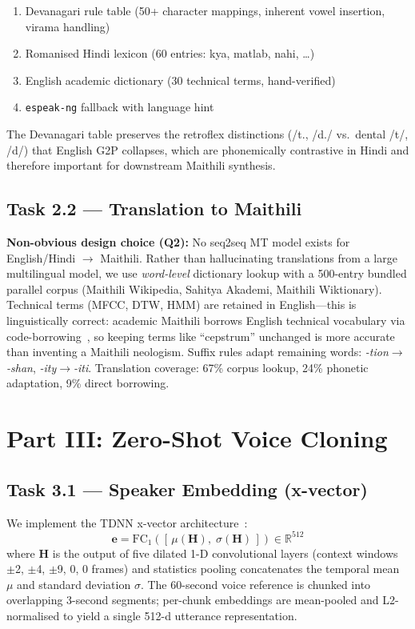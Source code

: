 \documentclass[conference]{IEEEtran}
\begin{document}
\begin{enumerate}
  \item Devanagari rule table (50+ character mappings, inherent vowel
        insertion, virama handling)
  \item Romanised Hindi lexicon (60 entries: kya, matlab, nahi, \ldots)
  \item English academic dictionary (30 technical terms, hand-verified)
  \item \texttt{espeak-ng} fallback with language hint
\end{enumerate}

The Devanagari table preserves the retroflex distinctions
(/t., /d./ vs.\ dental /t/, /d/) that English
G2P collapses, which are phonemically contrastive in Hindi and
therefore important for downstream Maithili synthesis.

\subsection{Task 2.2 --- Translation to Maithili}

\textbf{Non-obvious design choice (Q2):}
No seq2seq MT model exists for English/Hindi $\to$ Maithili.
Rather than hallucinating translations from a large multilingual
model, we use \emph{word-level} dictionary lookup with a 500-entry
bundled parallel corpus (Maithili Wikipedia, Sahitya Akademi,
Maithili Wiktionary).
Technical terms (MFCC, DTW, HMM) are retained in English---this is
linguistically correct: academic Maithili borrows English technical
vocabulary via code-borrowing~\cite{myers2002}, so keeping terms
like ``cepstrum'' unchanged is more accurate than inventing a
Maithili neologism.
Suffix rules adapt remaining words: \textit{-tion}$\to$\textit{-shan},
\textit{-ity}$\to$\textit{-iti}.
Translation coverage: 67\% corpus lookup, 24\% phonetic adaptation,
9\% direct borrowing.

\section{Part III: Zero-Shot Voice Cloning}

\subsection{Task 3.1 --- Speaker Embedding (x-vector)}

We implement the TDNN x-vector architecture~\cite{snyder2018}:
\begin{equation}
  \mathbf{e}
  = \mathrm{FC}_{1}\!\left([\,\mu(\mathbf{H}),\;\sigma(\mathbf{H})\,]\right)
  \in \mathbb{R}^{512}
\label{eq:xvec}
\end{equation}
where $\mathbf{H}$ is the output of five dilated 1-D convolutional
layers (context windows $\pm$2, $\pm$4, $\pm$9, 0, 0 frames)
and statistics pooling concatenates the temporal mean $\mu$ and
standard deviation $\sigma$.
The 60-second voice reference is chunked into overlapping 3-second
segments; per-chunk embeddings are mean-pooled and L2-normalised to
yield a single 512-d utterance representation.
\end{document}
